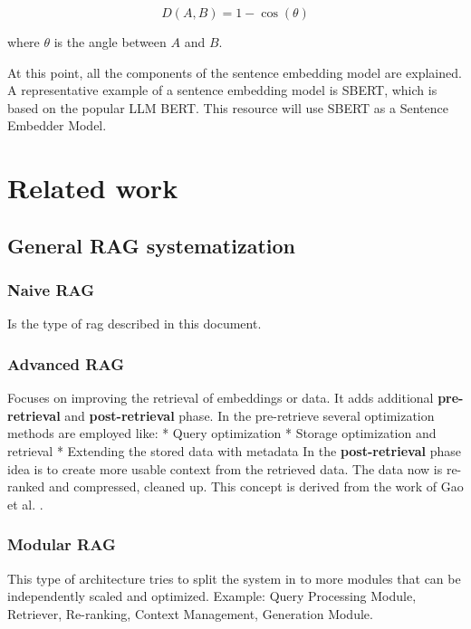 \documentclass{wseas}
\begin{document}
\begin{equation}
  D(A, B) = 1 - \cos(\theta)
\end{equation}

where \(\theta\) is the angle between \(A\) and \(B\).

At this point, all the components of the sentence embedding model are
explained. A representative example of a sentence embedding model is
SBERT, which is based on the popular LLM BERT. This resource will use
SBERT as a Sentence Embedder Model.


\section{Related work}

\subsection{General RAG
systematization}

\subsubsection{Naive RAG}

Is the type of rag described in this document.

\subsubsection{Advanced RAG}

Focuses on improving the retrieval of embeddings or data. It adds
additional \textbf{pre-retrieval} and \textbf{post-retrieval} phase. In
the pre-retrieve several optimization methods are employed like: 
* Query
optimization * Storage optimization and retrieval * Extending the stored
data with metadata In the \textbf{post-retrieval} phase idea is to
create more usable context from the retrieved data. The data now is
re-ranked and compressed, cleaned up. This concept is derived from the
work of Gao et al. \cite{cite4}.

\subsubsection{Modular RAG}

This type of architecture tries to split the system in to more modules
that can be independently scaled and optimized. Example: Query
Processing Module, Retriever, Re-ranking, Context Management, Generation
Module.
\end{document}
